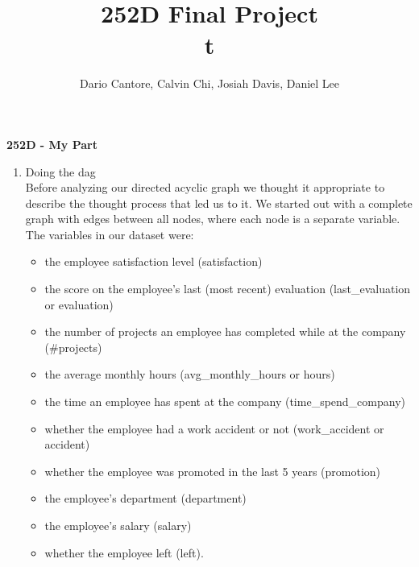 \documentclass[11pt]{article} %
\title{252D Final Project\\
\large t}
\author{Dario Cantore,  Calvin Chi, Josiah Davis, Daniel Lee}
\begin{document}
\centerline{\textbf{252D - My Part}}
\begin{enumerate}
\item Doing the dag\\
Before analyzing our directed acyclic graph we thought it appropriate to describe the thought process that led us to it. We started out with a complete graph with edges between all nodes, where each node is a separate variable. The variables in our dataset were: 
\begin{itemize} 
\item  the employee satisfaction level (satisfaction) 
\item  the score on the employee's last (most recent) evaluation (last\_evaluation or evaluation) 
\item  the number of projects an employee has completed while at the company (\#projects) 
\item  the average monthly hours (avg\_monthly\_hours or hours) 
\item  the time an employee has spent at the company (time\_spend\_company) 
\item  whether the employee had a work accident or not (work\_accident or accident) 
\item  whether the employee was promoted in the last 5 years (promotion) 
\item  the employee's department (department) 
\item  the employee's salary (salary) 
\item  whether the employee left (left).
\end{itemize}

\end{enumerate}
\end{document}
